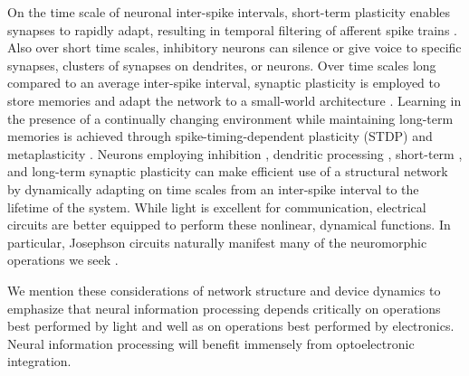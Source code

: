 \documentclass[twocolumn]{article}
\begin{document}
On the time scale of neuronal inter-spike intervals, short-term plasticity enables synapses to rapidly adapt, resulting in temporal filtering of afferent spike trains \cite{abre2004}. Also over short time scales, inhibitory neurons can silence or give voice to specific synapses, clusters of synapses on dendrites, or neurons. Over time scales long compared to an average inter-spike interval, synaptic plasticity is employed to store memories and adapt the network to a small-world architecture \cite{shki2006}. Learning in the presence of a continually changing environment while maintaining long-term memories is achieved through spike-timing-dependent plasticity (STDP) \cite{mage2012} and metaplasticity \cite{fudr2005,ab2008}. Neurons employing inhibition \cite{budr2004}, dendritic processing \cite{haah2015,stsp2015,sava2017}, short-term \cite{abre2004}, and long-term synaptic plasticity \cite{mage2012,ab2008,fudr2005} can make efficient use of a structural network by dynamically adapting on time scales from an inter-spike interval to the lifetime of the system. While light is excellent for communication, electrical circuits are better equipped to perform these nonlinear, dynamical functions. In particular, Josephson circuits naturally manifest many of the neuromorphic operations we seek \cite{sh2018,sh2018_full}.

We mention these considerations of network structure and device dynamics to emphasize that neural information processing depends critically on operations best performed by light and well as on operations best performed by electronics. Neural information processing will benefit immensely from optoelectronic integration.
\end{document}
